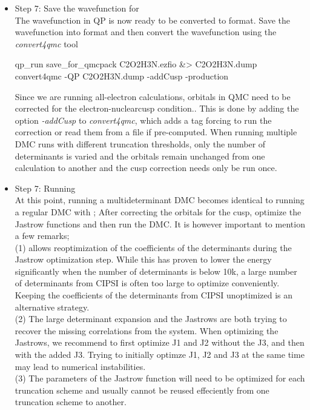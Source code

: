 \begin{itemize}
\item Step 7: Save the wavefunction for \qmcpack \\
The wavefunction in QP is now ready to be converted to \qmcpack format.
Save the wavefunction into \qmcpack format and then convert the wavefunction using the \textit{convert4qmc} tool\\

\begin{shade}
qp_run save_for_qmcpack C2O2H3N.ezfio &> C2O2H3N.dump  
convert4qmc -QP C2O2H3N.dump -addCusp -production
\end{shade}

Since we are running all-electron calculations, orbitals in QMC need
to be corrected for the electron-nuclearcusp condition..  This is done
by adding the option \textit{-addCusp} to \textit{convert4qmc}, which
adds a tag forcing \qmcpack to run the correction or read them from a
file if pre-computed. When running multiple DMC runs with different
truncation thresholds, only the number of determinants is varied and
the orbitals remain unchanged from one calculation to another and the
cusp correction needs only be run once.

\item Step 7: Running \qmcpack \\
At this point, running a multideterminant DMC becomes identical to running a regular DMC with \qmcpack; 
After correcting the orbitals for the cusp, optimize the Jastrow functions and then run the DMC. 
It is however important to mention a few remarks;\\

(1) \qmcpack allows reoptimization of the coefficients of the
determinants during the Jastrow optimization step. While this has
proven to lower the energy significantly when the number of
determinants is below 10k, a large number of determinants from CIPSI
is often too large to optimize conveniently. Keeping the coefficients
of the determinants from CIPSI unoptimized is an alternative strategy.\\

(2) The large determinant expansion and the Jastrows are both trying
to recover the missing correlations from the system. When optimizing
the Jastrows, we recommend to first optimize J1 and J2 without the J3,
and then with the added J3. Trying to initially optimze J1, J2 and J3
at the same time may lead to numerical instabilities.\\

(3) The parameters of the Jastrow function will need to be optimized
for each truncation scheme and usually cannot be reused effeciently
from one truncation scheme to another.


\end{itemize}
